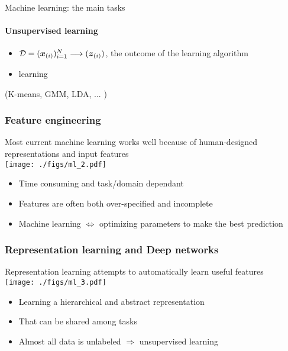   
\begin{frame}{Machine learning: the main tasks}
  \framesubtitle{Unsupervised learning}
  \begin{center}
  \end{center}

  \begin{itemize}
  \item $\mathcal{D}= (\boldsymbol{x}_{(i)} )_{i=1}^{N} \longrightarrow (\boldsymbol{z}_{(i)})$, the outcome of the learning algorithm
  \item {} learning 
  \end{itemize}
  (K-means, GMM, LDA, ... )
\end{frame}





\begin{frame}
  \frametitle{Feature engineering}
  \begin{center}
    Most current machine learning works well because of
    human-designed representations and input features\\[1cm]
    {\texttt{[image: ./figs/ml\_2.pdf]}}
    \begin{itemize}
    \item Time consuming and task/domain dependant
    \item Features are often both over-specified and incomplete
    \item Machine learning $\Leftrightarrow$ optimizing parameters to 
      make the best prediction
    \end{itemize}
  \end{center}
\end{frame}

\begin{frame}
  \frametitle{Representation learning and Deep networks}
  \begin{center}
    Representation learning attempts to
    automatically learn useful features\\[1cm]
    {\texttt{[image: ./figs/ml\_3.pdf]}}
  \end{center}
  \begin{itemize}
  \item Learning a hierarchical and abstract representation
  \item That can be shared among tasks
  \item Almost all data is unlabeled $\Rightarrow$ unsupervised learning
  \end{itemize}
\end{frame}


